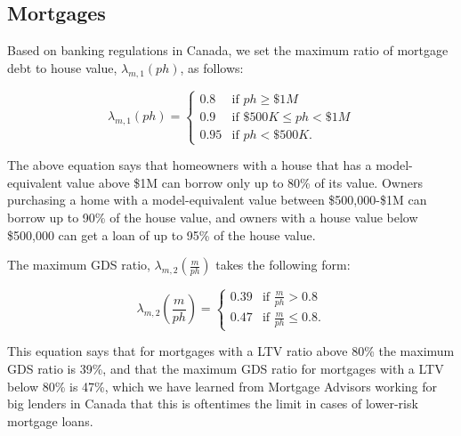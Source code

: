 \documentclass[parskip=full]{article}
\begin{document}
\subsection{Mortgages}

Based on banking regulations in Canada, we set the maximum ratio of mortgage debt to house value, $\lambda_{m,1}(ph)$, as follows:

\begin{equation*}
\lambda_{m,1}(ph) = \begin{cases}
0.8 &\text{if $ph\geq \$1M$}\\
0.9 &\text{if $\$500K\leq ph< \$1M$}\\
0.95 &\text{if $ph < \$500K$}.
\end{cases}
\end{equation*}

\noindent The above equation says that homeowners with a house that has a model-equivalent value above \$1M can borrow only up to 80\% of its value. Owners purchasing a home with a model-equivalent value between \$500,000-\$1M can borrow up to 90\% of the house value, and owners with a house value below \$500,000 can get a loan of up to 95\% of the house value. 

The maximum GDS ratio, $\lambda_{m,2}\left(\frac{m}{ph}\right)$ takes the following form:

\begin{equation*}
\lambda_{m,2}\left(\frac{m}{ph}\right) = \begin{cases}
0.39 &\text{if $\frac{m}{ph}>0.8$}\\
0.47 &\text{if $\frac{m}{ph}\leq 0.8$}.
\end{cases}
\end{equation*}

\noindent This equation says that for mortgages with a LTV ratio above 80\% the maximum GDS ratio is 39\%, and that the maximum GDS ratio for mortgages with a LTV below 80\% is 47\%, which we have learned from Mortgage Advisors working for big lenders in Canada that this is oftentimes the limit in cases of lower-risk mortgage loans. 
\end{document}
